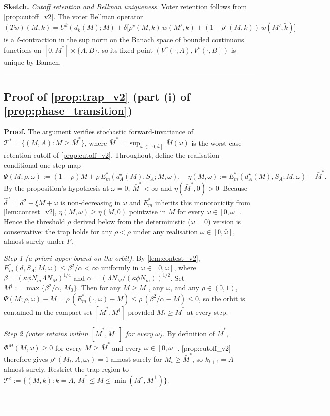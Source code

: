 \documentclass[11pt,twoside]{extarticle}
\newenvironment{proof}[1][Proof]{\noindent \textbf{#1.} }{\ \rule{0.5em}{0.5em}}
\begin{document}
\begin{proof}[Sketch]
\textit{Cutoff retention and Bellman uniqueness.} Voter retention
follows from \autoref{prop:cutoff_v2}. The voter Bellman operator
\[
(Tw)(M, k) = U^k(d_k(M); M) + \delta\big[\rho^v(M, k)\,w(M', k) + (1-\rho^v(M, k))\,w(M', \tilde k)\big]
\]
is a $\delta$-contraction in the sup norm on the Banach space of
bounded continuous functions on $[0, M^*] \times \{A, B\}$, so its
fixed point $(V^v(\cdot, A), V^v(\cdot, B))$ is unique by Banach.
\end{proof}

\subsection*{Proof of \autoref{prop:trap_v2} (part (i) of \autoref{prop:phase_transition})} \label{app:proof:trap_v2}

\begin{proof}
The argument verifies stochastic forward-invariance of $\mathcal T^*=\{(M,A):M\ge\bar M^*\}$, where $\bar M^*=\sup_{\omega\in[0,\bar\omega]}\bar M(\omega)$ is the worst-case retention cutoff of \autoref{prop:cutoff_v2}. Throughout, define the realisation-conditional one-step map
\[
\Psi(M;\rho,\omega) := (1-\rho)M + \rho\,E_m^*(d_A^\star(M), S_A; M, \omega),
\quad
\eta(M,\omega) := E_m^*(d_A^\star(M), S_A; M, \omega) - \bar M^*.
\]
By the proposition's hypothesis at $\omega=0$, $\bar M^*<\infty$ and $\eta(\bar M^*,0)>0$. Because $\hat d^\sigma=d^\sigma+\xi M+\omega$ is non-decreasing in $\omega$ and $E_m^*$ inherits this monotonicity from \autoref{lem:contest_v2}, $\eta(M,\omega)\ge\eta(M,0)$ pointwise in $M$ for every $\omega\in[0,\bar\omega]$. Hence the threshold $\bar\rho$ derived below from the deterministic ($\omega=0$) version is conservative: the trap holds for any $\rho<\bar\rho$ under any realisation $\omega\in[0,\bar\omega]$, almost surely under $F$.

\textit{Step 1 (a priori upper bound on the orbit).}
By \autoref{lem:contest_v2}, $E_m^*(d, S_A; M, \omega)\le\beta^2/\alpha<\infty$ uniformly in $\omega\in[0,\bar\omega]$, where $\beta=(\kappa\phi N_m\Lambda N_M)^{1/4}$ and $\alpha=(\Lambda N_M/(\kappa\phi N_m))^{1/2}$. Set $M^\dagger:=\max\{\beta^2/\alpha,\,M_0\}$. Then for any $M\ge M^\dagger$, any $\omega$, and any $\rho\in(0,1)$, $\Psi(M;\rho,\omega)-M=\rho\,(E_m^*(\cdot,\omega)-M)\le\rho\,(\beta^2/\alpha-M)\le 0$, so the orbit is contained in the compact set $[\bar M^*,M^\dagger]$ provided $M_t\ge\bar M^*$ at every step.

\textit{Step 2 (voter retains within $[\bar M^*,\overline M^+]$ for every $\omega$).}
By definition of $\bar M^*$, $\Phi^M(M,\omega)\ge 0$ for every $M\ge\bar M^*$ and every $\omega\in[0,\bar\omega]$. \autoref{prop:cutoff_v2} therefore gives $\rho^v(M_t,A,\omega_t)=1$ almost surely for $M_t\ge\bar M^*$, so $k_{t+1}=A$ almost surely. Restrict the trap region to $\mathcal T^c:=\{(M,k):k=A,\,\bar M^*\le M\le\min(M^\dagger,\overline M^+)\}$.


\end{proof}
\end{document}

